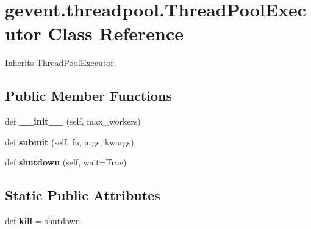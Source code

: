 \hypertarget{classgevent_1_1threadpool_1_1_thread_pool_executor}{}\section{gevent.\+threadpool.\+Thread\+Pool\+Executor Class Reference}
\label{classgevent_1_1threadpool_1_1_thread_pool_executor}


Inherits Thread\+Pool\+Executor.

\subsection*{Public Member Functions}
\begin{DoxyCompactItemize}
\item 
\mbox{\label{classgevent_1_1threadpool_1_1_thread_pool_executor_a911ec8079605bdcd82013b6ac2815af6}} 
def {\bfseries \+\_\+\+\_\+init\+\_\+\+\_\+} (self, max\+\_\+workers)
\item 
\mbox{\label{classgevent_1_1threadpool_1_1_thread_pool_executor_a70bcb04b0a037a771215e1dea619d379}} 
def {\bfseries submit} (self, fn, args, kwargs)
\item 
\mbox{\label{classgevent_1_1threadpool_1_1_thread_pool_executor_afb5aacb1d1ad99df78adc57bb708c256}} 
def {\bfseries shutdown} (self, wait=True)
\end{DoxyCompactItemize}
\subsection*{Static Public Attributes}
\begin{DoxyCompactItemize}
\item 
\mbox{\label{classgevent_1_1threadpool_1_1_thread_pool_executor_a283ab0409cadf22e421a2993c447dfbf}} 
def {\bfseries kill} = shutdown
\end{DoxyCompactItemize}


